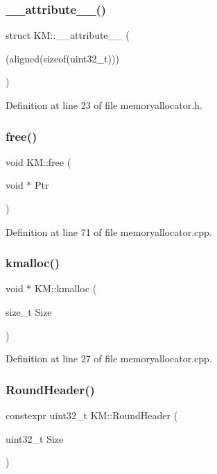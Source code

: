 \subsubsection{\texorpdfstring{\+\_\+\+\_\+attribute\+\_\+\+\_\+()}{\_\_attribute\_\_()}}
{\footnotesize\ttfamily struct K\+M\+::\+\_\+\+\_\+attribute\+\_\+\+\_\+ (\begin{DoxyParamCaption}\item[{(aligned(sizeof(uint32\+\_\+t)))}]{ }\end{DoxyParamCaption})}



Definition at line 23 of file memoryallocator.\+h.

\mbox{\label{namespace_k_m_a08363437a217255f3f9d2a393a54714b}} 
\subsubsection{\texorpdfstring{free()}{free()}}
{\footnotesize\ttfamily void K\+M\+::free (\begin{DoxyParamCaption}\item[{void $\ast$}]{Ptr }\end{DoxyParamCaption})}



Definition at line 71 of file memoryallocator.\+cpp.

\mbox{\label{namespace_k_m_aaeb8403b430af6311bb3c1df6ae520b6}} 
\subsubsection{\texorpdfstring{kmalloc()}{kmalloc()}}
{\footnotesize\ttfamily void $\ast$ K\+M\+::kmalloc (\begin{DoxyParamCaption}\item[{size\+\_\+t}]{Size }\end{DoxyParamCaption})}



Definition at line 27 of file memoryallocator.\+cpp.

\mbox{\label{namespace_k_m_a7ff0d2f89e64f1d4a08bf40e8fa096cc}} 
\subsubsection{\texorpdfstring{Round\+Header()}{RoundHeader()}}
{\footnotesize\ttfamily constexpr uint32\+\_\+t K\+M\+::\+Round\+Header (\begin{DoxyParamCaption}\item[{uint32\+\_\+t}]{Size }\end{DoxyParamCaption})}



